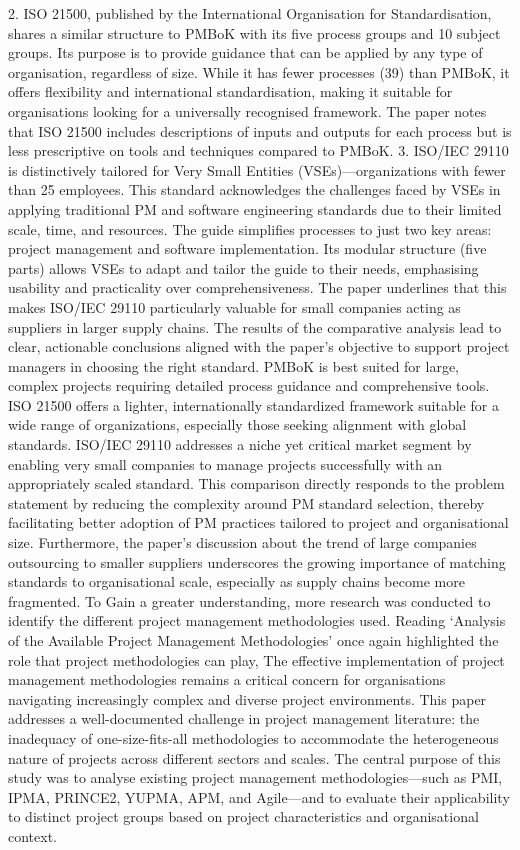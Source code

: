 \documentclass{report}
\begin{document}
    2. ISO 21500, published by the International Organisation for Standardisation, shares a similar structure to PMBoK with its five process groups and 10 subject groups. Its purpose is to provide guidance that can be applied by any type of organisation, regardless of size. While it has fewer processes (39) than PMBoK, it offers flexibility and international standardisation, making it suitable for organisations looking for a universally recognised framework. The paper notes that ISO 21500 includes descriptions of inputs and outputs for each process but is less prescriptive on tools and techniques compared to PMBoK.
    3. ISO/IEC 29110 is distinctively tailored for Very Small Entities (VSEs)—organizations with fewer than 25 employees. This standard acknowledges the challenges faced by VSEs in applying traditional PM and software engineering standards due to their limited scale, time, and resources. The guide simplifies processes to just two key areas: project management and software implementation. Its modular structure (five parts) allows VSEs to adapt and tailor the guide to their needs, emphasising usability and practicality over comprehensiveness. The paper underlines that this makes ISO/IEC 29110 particularly valuable for small companies acting as suppliers in larger supply chains.
The results of the comparative analysis lead to clear, actionable conclusions aligned with the paper’s objective to support project managers in choosing the right standard. PMBoK is best suited for large, complex projects requiring detailed process guidance and comprehensive tools. ISO 21500 offers a lighter, internationally standardized framework suitable for a wide range of organizations, especially those seeking alignment with global standards. ISO/IEC 29110 addresses a niche yet critical market segment by enabling very small companies to manage projects successfully with an appropriately scaled standard.
This comparison directly responds to the problem statement by reducing the complexity around PM standard selection, thereby facilitating better adoption of PM practices tailored to project and organisational size. Furthermore, the paper’s discussion about the trend of large companies outsourcing to smaller suppliers underscores the growing importance of matching standards to organisational scale, especially as supply chains become more fragmented. 
To Gain a greater understanding, more research was conducted to identify the different project management methodologies used. Reading ‘Analysis of the Available Project Management Methodologies’ \parencite{jovanovicAnalysisAvailableProject2018} once again highlighted the role that project methodologies can play, The effective implementation of project management methodologies remains a critical concern for organisations navigating increasingly complex and diverse project environments. This paper addresses a well-documented challenge in project management literature: the inadequacy of one-size-fits-all methodologies to accommodate the heterogeneous nature of projects across different sectors and scales. The central purpose of this study was to analyse existing project management methodologies—such as PMI, IPMA, PRINCE2, YUPMA, APM, and Agile—and to evaluate their applicability to distinct project groups based on project characteristics and organisational context.
\end{document}
